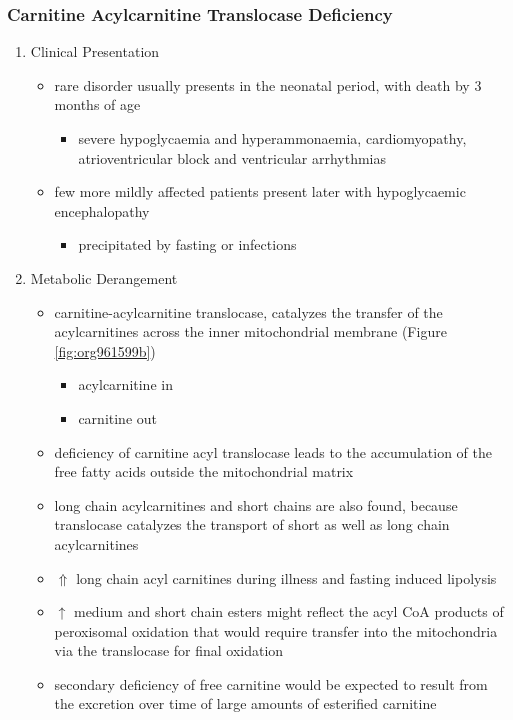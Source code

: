 \documentclass[12pt]{scrartcl}
\begin{document}
\subsubsection{Carnitine Acylcarnitine Translocase Deficiency}
\label{sec:orge0ab827}
\begin{enumerate}
\item Clinical Presentation
\label{sec:org0f73b75}
\begin{itemize}
\item rare disorder usually presents in the neonatal period, with
death by 3 months of age
\begin{itemize}
\item severe hypoglycaemia and hyperammonaemia, cardiomyopathy,
atrioventricular block and ventricular arrhythmias
\end{itemize}
\item few more mildly affected patients present later with hypoglycaemic
encephalopathy
\begin{itemize}
\item precipitated by fasting or infections
\end{itemize}
\end{itemize}
\item Metabolic Derangement
\label{sec:org22bc0bc}
\begin{itemize}
\item carnitine-acylcarnitine translocase, catalyzes the transfer of the
acylcarnitines across the inner mitochondrial membrane (Figure \ref{fig:org961599b})
\begin{itemize}
\item acylcarnitine in
\item carnitine out
\end{itemize}
\item deficiency of carnitine acyl translocase leads to the accumulation
of the free fatty acids outside the mitochondrial matrix
\item long chain acylcarnitines and short chains are also found, because
translocase catalyzes the transport of short as well as long chain
acylcarnitines
\item \(\Uparrow\) long chain acyl carnitines during illness and fasting
induced lipolysis
\item \(\uparrow\) medium and short chain esters might reflect the acyl CoA products
of peroxisomal oxidation that would require transfer into the
mitochondria via the translocase for final oxidation
\item secondary deficiency of free carnitine would be expected to result
from the excretion over time of large amounts of esterified
carnitine
\end{itemize}


\end{enumerate}
\end{document}
